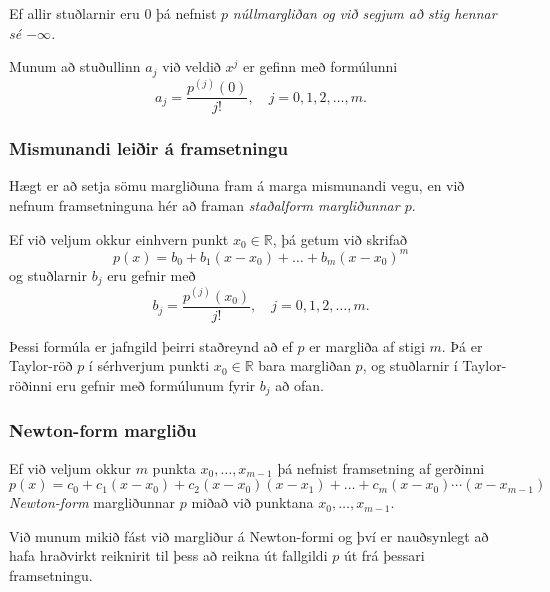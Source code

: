 \documentclass[icelandic,a4paper,12pt]{article}
\newcommand{\R}{{\mathbb  R}}
\begin{document}
\pause
\smallskip
Ef allir stuðlarnir 
eru 0 þá nefnist $p$ \em núllmargliðan \em og við segjum að 
stig hennar sé $-\infty$. 

\pause
\smallskip
Munum að stuðullinn $a_j$ við veldið 
$x^j$ er gefinn með formúlunni
\begin{equation*}
	a_j = \frac{p^{(j)}(0)}{j!}, \quad j = 0,1,2,\ldots,m.
\end{equation*} 


\subsubsection{Mismunandi leiðir á framsetningu} 

Hægt er að setja sömu margliðuna fram á marga mismunandi vegu, en 
við nefnum framsetninguna hér að framan {\em staðalform margliðunnar
  $p$}.

\pause
\smallskip
 Ef við  veljum okkur einhvern punkt $x_0 \in \R$, þá getum við skrifað
\begin{equation*}
	p(x) = b_0 + b_1(x-x_0) + \ldots + b_m(x-x_0)^m
\end{equation*}
og stuðlarnir $b_j$ eru gefnir með
\begin{equation*}
	b_j = \frac{p^{(j)}(x_0)}{j!}, \quad j = 0,1,2,\ldots,m.
\end{equation*}

\pause
\smallskip
Þessi formúla er jafngild þeirri staðreynd að ef $p$ er margliða af stigi
$m$. Þá er Taylor-röð $p$ í sérhverjum punkti $x_0 \in \R$ bara
margliðan $p$, og stuðlarnir í Taylor-röðinni eru gefnir með formúlunum 
fyrir $b_j$ að ofan.


\subsubsection{Newton-form margliðu} 

Ef við veljum okkur $m$ punkta $x_0, \ldots, x_{m-1}$ þá nefnist framsetning af gerðinni
\begin{equation*}
	p(x) = c_0 + c_1(x-x_0) + c_2(x-x_0)(x-x_1)
	+ \ldots + c_m(x-x_0)\cdots(x-x_{m-1})
\end{equation*}
\emph{Newton-form} margliðunnar $p$ miðað við punktana $x_0, \ldots,
x_{m-1}$.

\pause
\smallskip
 Við munum  mikið fást við margliður á Newton-formi og því
er  nauðsynlegt að hafa hraðvirkt reiknirit til þess að reikna út
fallgildi  $p$ út frá þessari framsetningu. 

\pause
\end{document}
